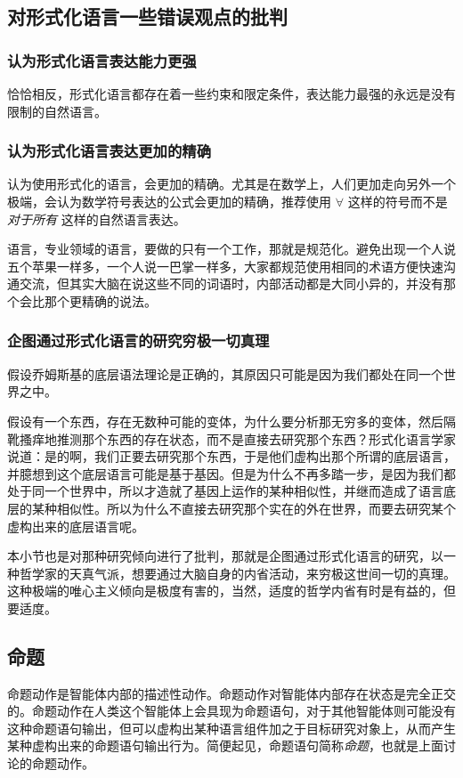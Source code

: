\documentclass[12pt,oneside]{book}
\begin{document}
\subsection{对形式化语言一些错误观点的批判}
\subsubsection{认为形式化语言表达能力更强}
恰恰相反，形式化语言都存在着一些约束和限定条件，表达能力最强的永远是没有限制的自然语言。


\subsubsection{认为形式化语言表达更加的精确}
认为使用形式化的语言，会更加的精确。尤其是在数学上，人们更加走向另外一个极端，会认为数学符号表达的公式会更加的精确，推荐使用 $\forall$ 这样的符号而不是 \textit{对于所有} 这样的自然语言表达。

语言，专业领域的语言，要做的只有一个工作，那就是规范化。避免出现一个人说五个苹果一样多，一个人说一巴掌一样多，大家都规范使用相同的术语方便快速沟通交流，但其实大脑在说这些不同的词语时，内部活动都是大同小异的，并没有那个会比那个更精确的说法。

\subsubsection{企图通过形式化语言的研究穷极一切真理}
假设乔姆斯基的底层语法理论是正确的，其原因只可能是因为我们都处在同一个世界之中。

假设有一个东西，存在无数种可能的变体，为什么要分析那无穷多的变体，然后隔靴搔痒地推测那个东西的存在状态，而不是直接去研究那个东西？形式化语言学家说道：是的啊，我们正要去研究那个东西，于是他们虚构出那个所谓的底层语言，并臆想到这个底层语言可能是基于基因。但是为什么不再多踏一步，是因为我们都处于同一个世界中，所以才造就了基因上运作的某种相似性，并继而造成了语言底层的某种相似性。所以为什么不直接去研究那个实在的外在世界，而要去研究某个虚构出来的底层语言呢。

本小节也是对那种研究倾向进行了批判，那就是企图通过形式化语言的研究，以一种哲学家的天真气派，想要通过大脑自身的内省活动，来穷极这世间一切的真理。这种极端的唯心主义倾向是极度有害的，当然，适度的哲学内省有时是有益的，但要适度。

\subsection{命题}
命题动作是智能体内部的描述性动作。命题动作对智能体内部存在状态是完全正交的。命题动作在人类这个智能体上会具现为命题语句，对于其他智能体则可能没有这种命题语句输出，但可以虚构出某种语言组件加之于目标研究对象上，从而产生某种虚构出来的命题语句输出行为。简便起见，命题语句简称\emph{命题}，也就是上面讨论的命题动作。
\end{document}
